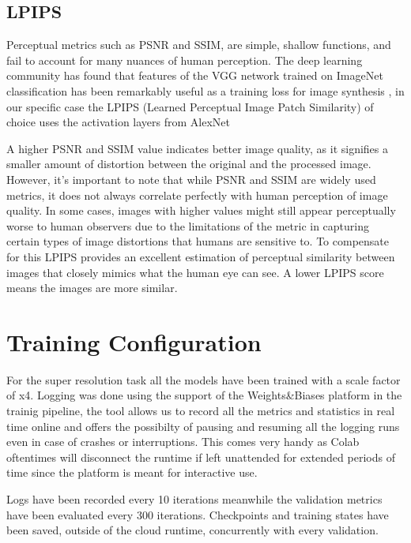 \subsection{LPIPS}
\label{subsec:LPIPS}
  Perceptual metrics such as PSNR and SSIM, are simple, shallow functions, and fail to account for many nuances of human perception. The deep learning community has found that features
  of the VGG network trained on ImageNet classification has
  been remarkably useful as a training loss for image synthesis \cite{zhang2018unreasonable}, in our specific case the LPIPS (Learned Perceptual Image Patch Similarity) of choice uses the activation layers from AlexNet \cite{NIPS2012_c399862d}


A higher PSNR and SSIM value indicates better image quality, as it signifies a smaller amount of distortion between the original and the processed image. However, it's important to note that while PSNR and SSIM are widely used metrics, it does not always correlate perfectly with human perception of image quality. In some cases, images with higher values might still appear perceptually worse to human observers due to the limitations of the metric in capturing certain types of image distortions that humans are sensitive to. To compensate for this LPIPS provides an excellent estimation of perceptual similarity between images that closely mimics what the human eye can see. A lower LPIPS score means the images are more similar.

\section{Training Configuration}
\label{sec:configuration}

For the super resolution task all the models have been trained with a scale factor of x4. Logging was done using the support of the Weights\&Biases platform in the trainig pipeline, the tool allows us to record all the metrics and statistics in real time online and offers the possibilty of pausing and resuming all the logging runs even in case of crashes or interruptions. This comes very handy as Colab oftentimes will disconnect the runtime if left unattended for extended periods of time since the platform is meant for interactive use.

Logs have been recorded every 10 iterations meanwhile the validation metrics have been evaluated every 300 iterations. Checkpoints and training states have been saved, outside of the cloud runtime, concurrently with every validation.
